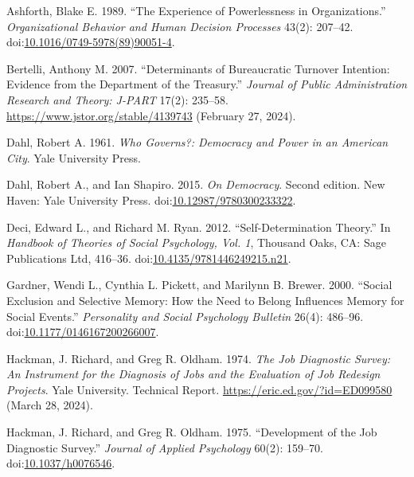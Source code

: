 \documentclass[
  11pt,
  a4paper,
]{article}
\newlength{\cslhangindent}
\newenvironment{CSLReferences}[2] %
 {\begin{list}{}{%
  \setlength{\itemindent}{0pt}
  \setlength{\leftmargin}{0pt}
  \setlength{\parsep}{0pt}
  \ifodd #1
   \setlength{\leftmargin}{\cslhangindent}
   \setlength{\itemindent}{-1\cslhangindent}
  \fi
  \setlength{\itemsep}{#2\baselineskip}}}
 {\end{list}}
\begin{document}
\label{refs}
\begin{CSLReferences}{1}{1}
Ashforth, Blake E. 1989. {``The Experience of Powerlessness in
Organizations.''} \emph{Organizational Behavior and Human Decision
Processes} 43(2): 207--42.
doi:\href{https://doi.org/10.1016/0749-5978(89)90051-4}{10.1016/0749-5978(89)90051-4}.

Bertelli, Anthony M. 2007. {``Determinants of {Bureaucratic Turnover
Intention}: {Evidence} from the {Department} of the {Treasury}.''}
\emph{Journal of Public Administration Research and Theory: J-PART}
17(2): 235--58. \url{https://www.jstor.org/stable/4139743} (February 27,
2024).

Dahl, Robert A. 1961. \emph{Who {Governs}?: {Democracy} and {Power} in
an {American City}}. Yale University Press.

Dahl, Robert A., and Ian Shapiro. 2015. \emph{On Democracy}. Second
edition. New Haven: Yale University Press.
doi:\href{https://doi.org/10.12987/9780300233322}{10.12987/9780300233322}.

Deci, Edward L., and Richard M. Ryan. 2012. {``Self-Determination
Theory.''} In \emph{Handbook of Theories of Social Psychology, {Vol}.
1}, Thousand Oaks, CA: Sage Publications Ltd, 416--36.
doi:\href{https://doi.org/10.4135/9781446249215.n21}{10.4135/9781446249215.n21}.

Gardner, Wendi L., Cynthia L. Pickett, and Marilynn B. Brewer. 2000.
{``Social Exclusion and Selective Memory: How the Need to Belong
Influences Memory for Social Events.''} \emph{Personality and Social
Psychology Bulletin} 26(4): 486--96.
doi:\href{https://doi.org/10.1177/0146167200266007}{10.1177/0146167200266007}.

Hackman, J. Richard, and Greg R. Oldham. 1974. \emph{The {Job Diagnostic
Survey}: {An Instrument} for the {Diagnosis} of {Jobs} and the
{Evaluation} of {Job Redesign Projects}}. Yale University. Technical
Report. \url{https://eric.ed.gov/?id=ED099580} (March 28, 2024).

Hackman, J. Richard, and Greg R. Oldham. 1975. {``Development of the
{Job Diagnostic Survey}.''} \emph{Journal of Applied Psychology} 60(2):
159--70. doi:\href{https://doi.org/10.1037/h0076546}{10.1037/h0076546}.


\end{CSLReferences}
\end{document}

